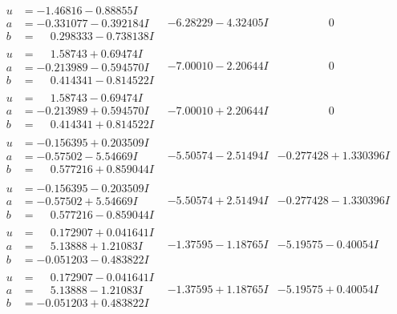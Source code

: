 \documentclass[1p]{elsarticle_modified}
\theoremstyle{definition}
\begin{document}
$$\begin{array}{c|c|c}
\begin{aligned}
u &= -1.46816 - 0.88855 I \\
a &= -0.331077 - 0.392184 I \\
b &= \phantom{-}0.298333 - 0.738138 I\end{aligned}
 & -6.28229 - 4.32405 I & \phantom{-0.000000 } 0 \\ \hline\begin{aligned}
u &= \phantom{-}1.58743 + 0.69474 I \\
a &= -0.213989 - 0.594570 I \\
b &= \phantom{-}0.414341 - 0.814522 I\end{aligned}
 & -7.00010 - 2.20644 I & \phantom{-0.000000 } 0 \\ \hline\begin{aligned}
u &= \phantom{-}1.58743 - 0.69474 I \\
a &= -0.213989 + 0.594570 I \\
b &= \phantom{-}0.414341 + 0.814522 I\end{aligned}
 & -7.00010 + 2.20644 I & \phantom{-0.000000 } 0 \\ \hline\begin{aligned}
u &= -0.156395 + 0.203509 I \\
a &= -0.57502 - 5.54669 I \\
b &= \phantom{-}0.577216 + 0.859044 I\end{aligned}
 & -5.50574 - 2.51494 I & -0.277428 + 1.330396 I \\ \hline\begin{aligned}
u &= -0.156395 - 0.203509 I \\
a &= -0.57502 + 5.54669 I \\
b &= \phantom{-}0.577216 - 0.859044 I\end{aligned}
 & -5.50574 + 2.51494 I & -0.277428 - 1.330396 I \\ \hline\begin{aligned}
u &= \phantom{-}0.172907 + 0.041641 I \\
a &= \phantom{-}5.13888 + 1.21083 I \\
b &= -0.051203 - 0.483822 I\end{aligned}
 & -1.37595 - 1.18765 I & -5.19575 - 0.40054 I \\ \hline\begin{aligned}
u &= \phantom{-}0.172907 - 0.041641 I \\
a &= \phantom{-}5.13888 - 1.21083 I \\
b &= -0.051203 + 0.483822 I\end{aligned}
 & -1.37595 + 1.18765 I & -5.19575 + 0.40054 I \\ \hline\begin{aligned}

\end{aligned}
\end{array}$$
\end{document}

